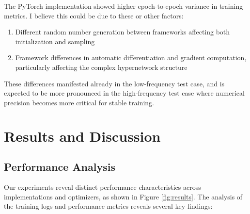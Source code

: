 \documentclass[10pt,journal,compsoc,onecolumn]{IEEEtran}
\begin{document}
The PyTorch implementation showed higher epoch-to-epoch variance in training metrics. I believe this could be due to these or other factors:
\begin{enumerate}
    \item Different random number generation between frameworks affecting both initialization and sampling
    \item Framework differences in automatic differentiation and gradient computation, particularly affecting the complex hypernetwork structure
\end{enumerate}

These differences manifested already in the low-frequency test case, and is expected to be more pronounced in the high-frequency test case where numerical precision becomes more critical for stable training.

\section{Results and Discussion}
\subsection{Performance Analysis}
Our experiments reveal distinct performance characteristics across implementations and optimizers, as shown in Figure \ref{fig:results}. The analysis of the training logs and performance metrics reveals several key findings:
\end{document}
